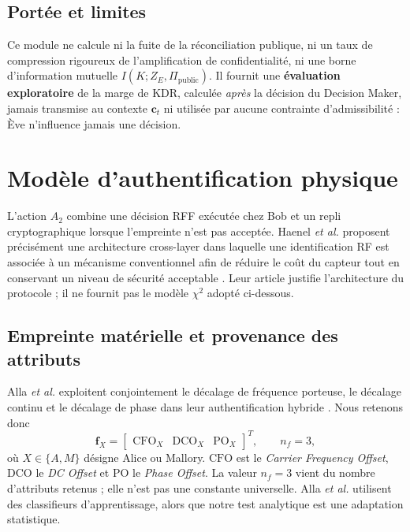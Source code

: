 \documentclass[conference,a4paper]{IEEEtran}
\begin{document}
\subsection{Portée et limites}
Ce module ne calcule ni la fuite de la réconciliation publique, ni un taux de compression rigoureux de l'amplification de confidentialité, ni une borne d'information mutuelle $I(K;Z_E,\Pi_{\mathrm{public}})$. Il fournit une \textbf{évaluation exploratoire} de la marge de KDR, calculée \emph{après} la décision du Decision Maker, jamais transmise au contexte $\mathbf{c}_t$ ni utilisée par aucune contrainte d'admissibilité : Ève n'influence jamais une décision.


\section{Modèle d'authentification physique}
\label{sec:auth-phy}

L'action $A_2$ combine une décision RFF exécutée chez Bob et un repli cryptographique lorsque l'empreinte n'est pas acceptée. Haenel \emph{et al.} proposent précisément une architecture cross-layer dans laquelle une identification RF est associée à un mécanisme conventionnel afin de réduire le coût du capteur tout en conservant un niveau de sécurité acceptable \cite[Secs.~4--6]{haenel2021}. Leur article justifie l'architecture du protocole ; il ne fournit pas le modèle $\chi^2$ adopté ci-dessous.

\subsection{Empreinte matérielle et provenance des attributs}
Alla \emph{et al.} exploitent conjointement le décalage de fréquence porteuse, le décalage continu et le décalage de phase dans leur authentification hybride \cite[Sec.~III]{alla2024}. Nous retenons donc
\begin{equation}
\mathbf f_X=
\begin{bmatrix}
\mathrm{CFO}_X&\mathrm{DCO}_X&\mathrm{PO}_X
\end{bmatrix}^{\!T},
\qquad n_f=3,
\label{eq:rff-vector}
\end{equation}
où $X\in\{A,M\}$ désigne Alice ou Mallory. $\mathrm{CFO}$ est le \emph{Carrier Frequency Offset}, $\mathrm{DCO}$ le \emph{DC Offset} et $\mathrm{PO}$ le \emph{Phase Offset}. La valeur $n_f=3$ vient du nombre d'attributs retenus ; elle n'est pas une constante universelle. Alla \emph{et al.} utilisent des classifieurs d'apprentissage, alors que notre test analytique est une adaptation statistique.
\end{document}
